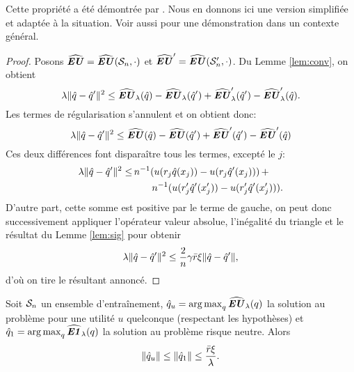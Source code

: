 \begin{rem}
  Cette propriété a été démontrée par \cite{bousquet2002stability}. Nous en donnons ici
  une version simplifiée et adaptée à la situation. Voir aussi \cite{mohri2012foundations}
  pour une démonstration dans un contexte général.
\end{rem}

\begin{proof}
  Posons $\hEU = \hEU(\S_n,\cdot)$ et $\hEU' = \hEU(\S_n',\cdot)$. Du Lemme \ref{lem:conv}, on
  obtient
  \begin{equation}
    \lambda\|\qh - \qh'\|^2 \leq \hEU_\lambda(\qh) - \hEU_\lambda(\qh') + \hEU'_\lambda(\qh') - \hEU'_\lambda(\qh).
  \end{equation}
  Les termes de régularisation s'annulent et on obtient donc:
  \begin{equation}
    \lambda\|\qh - \qh'\|^2 \leq \hEU(\qh) - \hEU(\qh') + \hEU'(\qh') - \hEU'(\qh)
  \end{equation}
  Ces deux différences font disparaître tous les termes, excepté le
  $j$\ieme:
  \begin{align}
    \lambda\|\qh - \qh'\|^2 \leq &\,n^{-1}(u(r_j\qh(x_j)) - u(r_j\qh'(x_j)))\, + \\
                        & \qquad n^{-1}(u(r_j'\qh'(x_j')) - u(r_j'\qh'(x_j'))).
  \end{align}
  D'autre part, cette somme est positive par le terme de gauche, on peut donc
  successivement appliquer l'opérateur valeur absolue, l'inégalité du triangle et
  le résultat du Lemme \ref{lem:sig} pour obtenir
  \begin{equation}
    \lambda\|\qh - \qh'\|^2 \leq \frac{2}{n}\gamma\rmax\xi\|\qh - \qh'\|,
  \end{equation}
  d'où on tire le résultant annoncé.
\end{proof}

\begin{lemme}
  \label{lem:dl}
  Soit $\S_n$ un ensemble d'entraînement, $\qh_u = \argmax_q\hEU_\lambda(q)$ la solution au
  problème pour une utilité $u$ quelconque (respectant les hypothèses) et
  $\qh_1 = \argmax_q\hEN_\lambda(q)$ la solution au problème risque neutre. Alors
  \begin{equation}
    \|\qh_u\| \leq \|\qh_1\| \leq \frac{\rmax\xi}{\lambda}.
  \end{equation}
\end{lemme}

